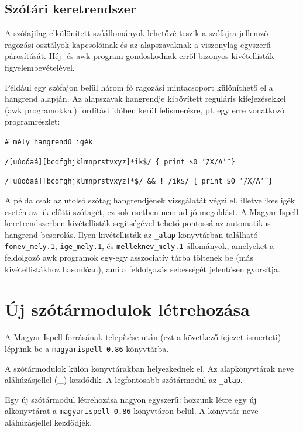 \subsection{Szótári keretrendszer}

A szófajilag elkülönített szóállományok lehetővé teszik a szófajra
jellemző ragozási osztályok kapcsolóinak és az alapszavaknak
a viszonylag egyszerű párosítását.
Héj- és awk program gondoskodnak erről bizonyos kivétellisták
figyelembevételével.

Például egy szófajon belül három fő ragozási
mintacsoport különíthető el a hangrend alapján. Az alapszavak
hangrendje kibővített reguláris kifejezésekkel (awk programokkal)
fordítási időben kerül felismerésre, pl. egy erre
vonatkozó programrészlet:

\texttt{\#~mély~hangrendű~igék~}

\texttt{/{[}uúoóaá{]}{[}bcdfghjklmnprstvxyz{]}{*}ik\$/~\{~print~\$0~\char`\"{}/X/A\char`\"{}
\}}

\texttt{/{[}uúoóaá{]}{[}bcdfghjklmnprstvxyz{]}{*}\$/~\&\&~!~/ik\$/~\{~print
\$0~\char`\"{}/X/A\char`\"{}~\}}

A példa csak az utolsó szótag hangrendjének vizsgálatát végzi el,
illetve ikes igék esetén az -ik előtti szótagét, ez sok esetben nem
ad jó megoldást. A Magyar Ispell keretrendszerben
kivétellisták segítségével tehető pontossá az automatikus
hangrend-besorolás. Ilyen kivétellisták az \texttt{\_alap} könyvtárban
található \texttt{fonev\_mely.1}, \texttt{ige\_mely.1}, és
\texttt{melleknev\_mely.1} állományok,
amelyeket a feldolgozó awk programok egy-egy asszociatív tárba
töltenek be (más kivétellistákhoz hasonlóan), ami a feldolgozás
sebességét jelentősen gyorsítja.

\section{Új szótármodulok létrehozása}

A Magyar Ispell forrásának telepítése után (ezt a következő fejezet ismerteti)
lépjünk be a \texttt{magyarispell-0.86} könyvtárba.

A szótármodulok külön könyvtárakban helyezkednek el. Az alapkönyvtárak
neve aláhúzásjellel (\_) kezdődik. A legfontosabb szótármodul az
\texttt{\_alap}.

Egy új szótármodul létrehozása nagyon egyszerű: hozzunk létre egy
új alkönyvtárat a \texttt{magyarispell-0.86} könyvtáron belül.
A könyvtár neve aláhúzásjellel kezdődjék.

